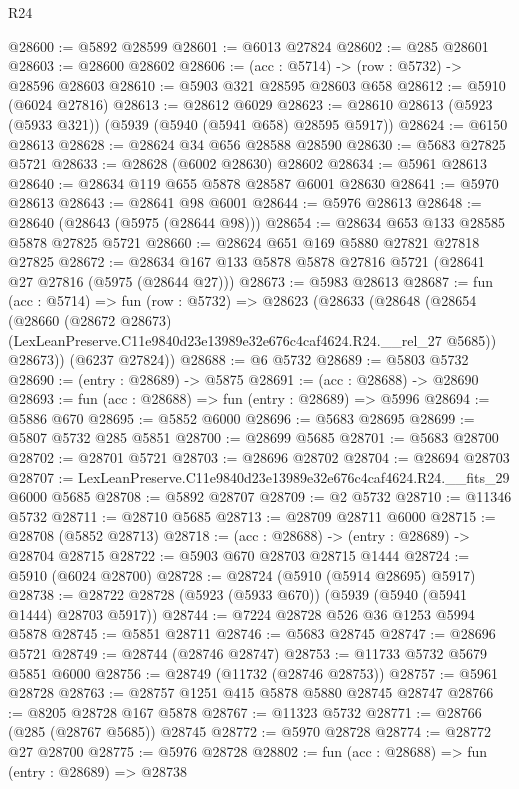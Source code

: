 \begin{lexlean}{R24}
\begin{coremodule}
@28600 := @5892 @28599
@28601 := @6013 @27824
@28602 := @285 @28601
@28603 := @28600 @28602
@28606 := (acc : @5714) -> (row : @5732) -> @28596 @28603
@28610 := @5903 @321 @28595 @28603 @658
@28612 := @5910 (@6024 @27816)
@28613 := @28612 @6029
@28623 := @28610 @28613 (@5923 (@5933 @321)) (@5939 (@5940 (@5941 @658) @28595 @5917))
@28624 := @6150 @28613
@28628 := @28624 @34 @656 @28588 @28590
@28630 := @5683 @27825 @5721
@28633 := @28628 (@6002 @28630) @28602
@28634 := @5961 @28613
@28640 := @28634 @119 @655 @5878 @28587 @6001 @28630
@28641 := @5970 @28613
@28643 := @28641 @98 @6001
@28644 := @5976 @28613
@28648 := @28640 (@28643 (@5975 (@28644 @98)))
@28654 := @28634 @653 @133 @28585 @5878 @27825 @5721
@28660 := @28624 @651 @169 @5880 @27821 @27818 @27825
@28672 := @28634 @167 @133 @5878 @5878 @27816 @5721 (@28641 @27 @27816 (@5975 (@28644 @27)))
@28673 := @5983 @28613
@28687 := fun (acc : @5714) =>
  fun (row : @5732) =>
  @28623
    (@28633
      (@28648
        (@28654
          (@28660
            (@28672 @28673)
            (LexLeanPreserve.C11e9840d23e13989e32e676c4caf4624.R24.__rel_27 @5685))
          @28673))
      (@6237 @27824))
@28688 := @6 @5732
@28689 := @5803 @5732
@28690 := (entry : @28689) -> @5875
@28691 := (acc : @28688) -> @28690
@28693 := fun (acc : @28688) => fun (entry : @28689) => @5996
@28694 := @5886 @670
@28695 := @5852 @6000
@28696 := @5683 @28695
@28699 := @5807 @5732 @285 @5851
@28700 := @28699 @5685
@28701 := @5683 @28700
@28702 := @28701 @5721
@28703 := @28696 @28702
@28704 := @28694 @28703
@28707 := LexLeanPreserve.C11e9840d23e13989e32e676c4caf4624.R24.__fits_29 @6000 @5685
@28708 := @5892 @28707
@28709 := @2 @5732
@28710 := @11346 @5732
@28711 := @28710 @5685
@28713 := @28709 @28711 @6000
@28715 := @28708 (@5852 @28713)
@28718 := (acc : @28688) -> (entry : @28689) -> @28704 @28715
@28722 := @5903 @670 @28703 @28715 @1444
@28724 := @5910 (@6024 @28700)
@28728 := @28724 (@5910 (@5914 @28695) @5917)
@28738 := @28722 @28728 (@5923 (@5933 @670)) (@5939 (@5940 (@5941 @1444) @28703 @5917))
@28744 := @7224 @28728 @526 @36 @1253 @5994 @5878
@28745 := @5851 @28711
@28746 := @5683 @28745
@28747 := @28696 @5721
@28749 := @28744 (@28746 @28747)
@28753 := @11733 @5732 @5679 @5851 @6000
@28756 := @28749 (@11732 (@28746 @28753))
@28757 := @5961 @28728
@28763 := @28757 @1251 @415 @5878 @5880 @28745 @28747
@28766 := @8205 @28728 @167 @5878
@28767 := @11323 @5732
@28771 := @28766 (@285 (@28767 @5685)) @28745
@28772 := @5970 @28728
@28774 := @28772 @27 @28700
@28775 := @5976 @28728
@28802 := fun (acc : @28688) =>
  fun (entry : @28689) =>
  @28738

\end{coremodule}
\end{lexlean}
